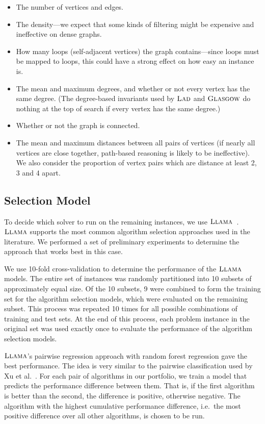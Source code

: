 \documentclass{llncs}
\newcommand{\Glasgow}{$\textsc{Glasgow}$\xspace}
\newcommand{\LAD}{$\textsc{Lad}$\xspace}
\newcommand{\LLAMA}{$\textsc{Llama}$\xspace}
\begin{document}
\begin{itemize}
    \item The number of vertices and edges.
    \item The density---we expect that some kinds of filtering might be expensive and ineffective on
        dense graphs.
    \item How many loops (self-adjacent vertices) the graph contains---since loops must be mapped to
        loops, this could have a strong effect on how easy an instance is.
    \item The mean and maximum degrees, and whether or not every vertex has the same degree. (The
        degree-based invariants used by \LAD and \Glasgow do nothing at the top of search if every
        vertex has the same degree.)
    \item Whether or not the graph is connected.
    \item The mean and maximum distances between all pairs of vertices (if nearly all vertices are
        close together, path-based reasoning is likely to be ineffective). We also consider the
        proportion of vertex pairs which are distance at least 2, 3 and 4 apart.
\end{itemize}

\subsection{Selection Model}

To decide which solver to run on the remaining instances, we use \LLAMA~\cite{kotthoff_llama_2013}.
\LLAMA supports the most common algorithm selection approaches used in the literature. We performed a
set of preliminary experiments to determine the approach that works best in this case.

We use 10-fold cross-validation to determine the performance of the \LLAMA models. The entire set of
instances was randomly partitioned into 10 subsets of approximately equal size. Of the 10 subsets, 9
were combined to form the training set for the algorithm selection models, which were evaluated on
the remaining subset. This process was repeated 10 times for all possible combinations of training
and test sets. At the end of this process, each problem instance in the original set was used
exactly once to evaluate the performance of the algorithm selection models.

\LLAMA's pairwise regression approach with random forest regression gave the best performance. The
idea is very similar to the pairwise classification used by Xu et al.\ \cite{xu_satzilla_2008}. For
each pair of algorithms in our portfolio, we train a model that predicts the performance difference
between them. That is, if the first algorithm is better than the second, the difference is positive,
otherwise negative. The algorithm with the highest cumulative performance difference, i.e.\ the most
positive difference over all other algorithms, is chosen to be run.
\end{document}
